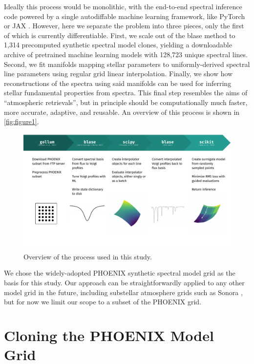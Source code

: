 \documentclass[twocolumn, linenumbers]{aastex631}
\begin{document}
Ideally this process would be monolithic, with the end-to-end spectral inference code powered by a single autodiffable machine learning framework, like PyTorch or JAX \citep{pytorch, jax}. 
However, here we separate the problem into three pieces, only the first of which is currently differentiable.
First, we scale out of the blase method to 1,314 precomputed synthetic spectral model clones, yielding a downloadable archive of pretrained machine learning models with 128,723 unique spectral lines. 
Second, we fit manifolds mapping stellar parameters to uniformly-derived spectral line parameters using regular grid linear interpolation. 
Finally, we show how reconstructions of the spectra using said manifolds can be used for inferring stellar fundamental properties from spectra. 
This final step resembles the aims of ``atmospheric retrievals'', but in principle should be computationally much faster, more accurate, adaptive, and reusable.
An overview of this process is shown in \autoref{fig:figure1}.

\begin{figure}
    \centering
    \includegraphics[width=\textwidth]{figure1}
    \caption{Overview of the process used in this study.}
    \label{fig:figure1}
\end{figure}

We chose the widely-adopted PHOENIX synthetic spectral model grid \citep{PHOENIX} as the basis for this study.
Our approach can be straightforwardly applied to any other model grid in the future, including substellar atmosphere grids such as Sonora \citep{bobcat, cholla, diamondback, elfowl}, but for now we limit our scope to a subset of the PHOENIX grid.


\section{Cloning the PHOENIX Model Grid}
\end{document}
